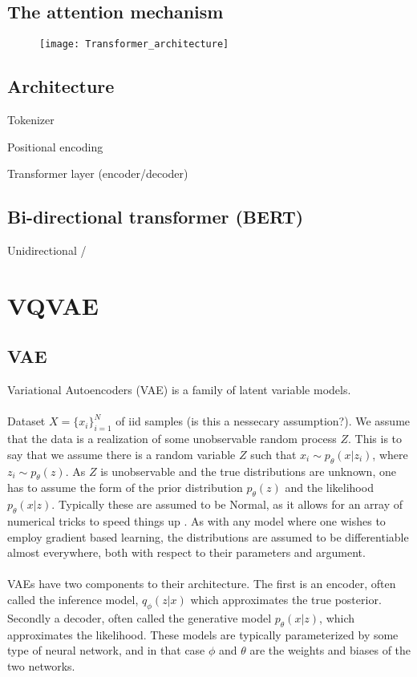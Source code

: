 \documentclass[../../thesis.tex]{subfiles}
\begin{document}
\subsection{The attention mechanism}


\begin{figure}[h]
    \texttt{[image: Transformer\_architecture]}
    \centering    
\end{figure}

\subsection{Architecture}

Tokenizer

Positional encoding


Transformer layer (encoder/decoder)

\subsection{Bi-directional transformer (BERT)}

Unidirectional / 




\section{VQVAE}

\subsection{VAE}
Variational Autoencoders (VAE) is a family of latent variable models. 
\\\\

Dataset $X = \{x_i\}_{i=1}^{N}$ of iid samples (is this a nessecary assumption?). We assume that the data is a realization of some unobservable random process $Z$. This is to say that we assume there is a random variable $Z$ such that $x_i \sim p_{\theta}(x|z_i)$, where $z_i \sim p_{\theta}(z)$. As $Z$ is unobservable and the true distributions are unknown, one has to assume the form of the prior distribution $p_{\theta}(z)$ and the likelihood $p_{\theta}(x|z)$. Typically these are assumed to be Normal, as it allows for an array of numerical tricks to speed things up . As with any model where one wishes to employ gradient based learning, the distributions are assumed to be differentiable almost everywhere, both with respect to their parameters and argument. \\\\
VAEs have two components to their architecture. The first is an encoder, often called the inference model, $q_\phi(z|x)$ which approximates the true posterior. Secondly a decoder, often called the generative model $p_\theta(x|z)$, which approximates the likelihood. These models are typically parameterized by some type of neural network, and in that case $\phi$ and $\theta$ are the weights and biases of the two networks. 
\end{document}
